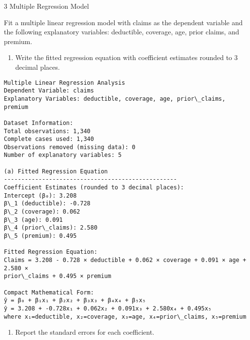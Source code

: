 \documentclass[8pt, twocolumn]{extarticle}
\providecommand{\tightlist}{%
      \setlength{\itemsep}{0pt}\setlength{\parskip}{0pt}}
\begin{document}
    3 Multiple Regression Model

Fit a multiple linear regression model with claims as the dependent
variable and the following explanatory variables: deductible, coverage,
age, prior claims, and premium.

    \begin{enumerate}
\def\labelenumi{(\alph{enumi})}
\tightlist
\item
  Write the fitted regression equation with coefficient estimates
  rounded to 3 decimal places.
\end{enumerate}

    \begin{Verbatim}[commandchars=\\\{\}]
Multiple Linear Regression Analysis
Dependent Variable: claims
Explanatory Variables: deductible, coverage, age, prior\_claims, premium

Dataset Information:
Total observations: 1,340
Complete cases used: 1,340
Observations removed (missing data): 0
Number of explanatory variables: 5

(a) Fitted Regression Equation
--------------------------------------------------
Coefficient Estimates (rounded to 3 decimal places):
Intercept (β₀): 3.208
β\_1 (deductible): -0.728
β\_2 (coverage): 0.062
β\_3 (age): 0.091
β\_4 (prior\_claims): 2.580
β\_5 (premium): 0.495

Fitted Regression Equation:
Claims = 3.208 - 0.728 × deductible + 0.062 × coverage + 0.091 × age + 2.580 ×
prior\_claims + 0.495 × premium

Compact Mathematical Form:
ŷ = β₀ + β₁x₁ + β₂x₂ + β₃x₃ + β₄x₄ + β₅x₅
ŷ = 3.208 + -0.728x₁ + 0.062x₂ + 0.091x₃ + 2.580x₄ + 0.495x₅
where x₁=deductible, x₂=coverage, x₃=age, x₄=prior\_claims, x₅=premium
    \end{Verbatim}

    \begin{enumerate}
\def\labelenumi{(\alph{enumi})}
\setcounter{enumi}{1}
\tightlist
\item
  Report the standard errors for each coefficient.
\end{enumerate}
\end{document}
